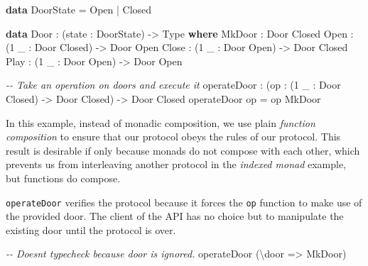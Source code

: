 \documentclass[
]{article}
\newenvironment{Shaded}{}{}
\newcommand{\CommentTok}[1]{\textcolor[rgb]{0.38,0.63,0.69}{\textit{#1}}}
\newcommand{\DataTypeTok}[1]{\textcolor[rgb]{0.56,0.13,0.00}{#1}}
\newcommand{\DecValTok}[1]{\textcolor[rgb]{0.25,0.63,0.44}{#1}}
\newcommand{\KeywordTok}[1]{\textcolor[rgb]{0.00,0.44,0.13}{\textbf{#1}}}
\newcommand{\NormalTok}[1]{#1}
\newcommand{\OperatorTok}[1]{\textcolor[rgb]{0.40,0.40,0.40}{#1}}
\newcommand{\OtherTok}[1]{\textcolor[rgb]{0.00,0.44,0.13}{#1}}
\begin{document}
\begin{Shaded}
\begin{Highlighting}[]

\KeywordTok{data} \DataTypeTok{DoorState} \OtherTok{=} \DataTypeTok{Open} \OperatorTok{|} \DataTypeTok{Closed}

\KeywordTok{data} \DataTypeTok{Door} \OperatorTok{:}\NormalTok{ (state }\OperatorTok{:} \DataTypeTok{DoorState}\NormalTok{) }\OtherTok{{-}\textgreater{}} \DataTypeTok{Type} \KeywordTok{where}
  \DataTypeTok{MkDoor} \OperatorTok{:} \DataTypeTok{Door} \DataTypeTok{Closed}
  \DataTypeTok{Open} \OperatorTok{:}\NormalTok{ (}\DecValTok{1}\NormalTok{ \_ }\OperatorTok{:} \DataTypeTok{Door} \DataTypeTok{Closed}\NormalTok{) }\OtherTok{{-}\textgreater{}} \DataTypeTok{Door} \DataTypeTok{Open}
  \DataTypeTok{Close} \OperatorTok{:}\NormalTok{ (}\DecValTok{1}\NormalTok{ \_ }\OperatorTok{:} \DataTypeTok{Door} \DataTypeTok{Open}\NormalTok{) }\OtherTok{{-}\textgreater{}} \DataTypeTok{Door} \DataTypeTok{Closed}
  \DataTypeTok{Play} \OperatorTok{:}\NormalTok{ (}\DecValTok{1}\NormalTok{ \_ }\OperatorTok{:} \DataTypeTok{Door} \DataTypeTok{Open}\NormalTok{) }\OtherTok{{-}\textgreater{}} \DataTypeTok{Door} \DataTypeTok{Open}

\CommentTok{{-}{-} Take an operation on doors and execute it}
\NormalTok{operateDoor }\OperatorTok{:}\NormalTok{ (op }\OperatorTok{:}\NormalTok{ (}\DecValTok{1}\NormalTok{ \_ }\OperatorTok{:} \DataTypeTok{Door} \DataTypeTok{Closed}\NormalTok{) }\OtherTok{{-}\textgreater{}} \DataTypeTok{Door} \DataTypeTok{Closed}\NormalTok{)}
           \OtherTok{{-}\textgreater{}} \DataTypeTok{Door} \DataTypeTok{Closed}
\NormalTok{operateDoor op }\OtherTok{=}\NormalTok{ op }\DataTypeTok{MkDoor}
\end{Highlighting}
\end{Shaded}

In this example, instead of monadic composition, we use plain
\emph{function composition} to ensure that our protocol obeys the rules
of our protocol. This result is desirable if only because monads do not
compose with each other, which prevents us from interleaving another
protocol in the \emph{indexed monad} example, but functions do compose.

\texttt{operateDoor} verifies the protocol because it forces the
\texttt{op} function to make use of the provided door. The client of the
API has no choice but to manipulate the existing door until the protocol
is over.

\begin{Shaded}
\begin{Highlighting}[]
\CommentTok{{-}{-} Doesn\textquotesingle{}t typecheck because door is ignored.}
\NormalTok{operateDoor (\textbackslash{}door }\OtherTok{=\textgreater{}} \DataTypeTok{MkDoor}\NormalTok{) }
\end{Highlighting}
\end{Shaded}
\end{document}
